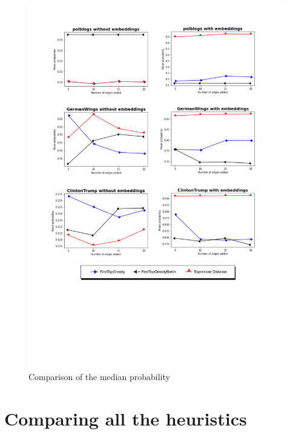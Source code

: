 \begin{figure}[!htbp]
	\begin{center}
	\advance\leftskip-1.3cm
	\captionsetup{justification=centering,margin=2cm}
	\includegraphics[width=1.2\textwidth]{Figures/m2}
	\caption{Comparison of the median probability}
	\end{center}
	\label{m2}
\end{figure}
\clearpage

\section{Comparing all the heuristics}		
\label{sec:all}

